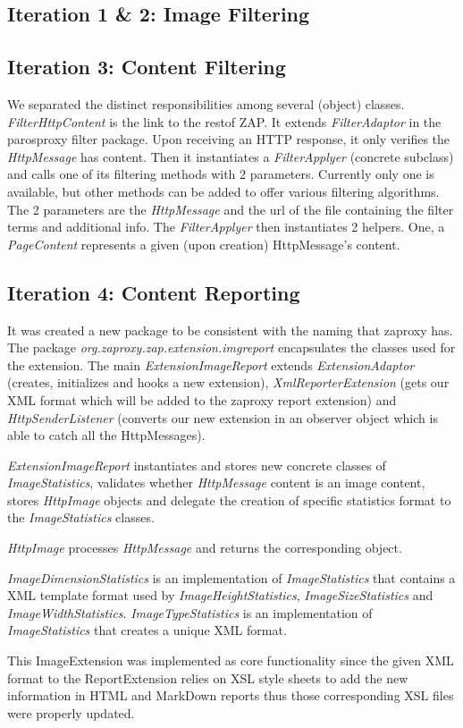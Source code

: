 \subsection{Iteration 1 \& 2: Image Filtering}
\subsection{Iteration 3: Content Filtering}
We separated the distinct responsibilities among several (object) classes. \textit{FilterHttpContent} is the link to the restof ZAP. It extends \textit{FilterAdaptor} in the parosproxy filter package. Upon receiving an HTTP response, it only verifies the \textit{HttpMessage} has content. Then it instantiates a \textit{FilterApplyer} (concrete subclass) and calls one of its filtering methods with 2 parameters. Currently only one is available, but other methods can be added to offer various filtering algorithms. The 2 parameters are the \textit{HttpMessage} and the url of the file containing the filter terms and additional info.
The \textit{FilterApplyer} then instantiates 2 helpers. One, a \textit{PageContent} represents a given (upon creation) HttpMessage's  content.
\subsection{Iteration 4: Content Reporting}
It was created a new package to be consistent with the naming that zaproxy has. The package \textit{org.zaproxy.zap.extension.imgreport} encapsulates the classes used for the extension. The main \textit{ExtensionImageReport} extends \textit{ExtensionAdaptor} (creates, initializes and hooks a new extension), \textit{XmlReporterExtension} (gets our XML format which will be added to the zaproxy report extension) and \textit{HttpSenderListener} (converts our new extension in an observer object which is able to catch all the HttpMessages).
\par
\textit{ExtensionImageReport} instantiates and stores new concrete classes of \textit{ImageStatistics}, validates whether \textit{HttpMessage} content is an image content, stores \textit{HttpImage} objects and delegate the creation of specific statistics format to the \textit{ImageStatistics} classes. 
\par
\textit{HttpImage} processes \textit{HttpMessage} and returns the corresponding object.
\par
\textit{ImageDimensionStatistics} is an implementation of \textit{ImageStatistics} that contains a XML template format used by \textit{ImageHeightStatistics}, \textit{ImageSizeStatistics} and \textit{ImageWidthStatistics}. \textit{ImageTypeStatistics} is an implementation of \textit{ImageStatistics} that creates a unique XML format.
\par
This ImageExtension was implemented as core functionality since the given XML format to the ReportExtension relies on XSL style sheets to add the new information in HTML and MarkDown reports thus those corresponding XSL files were properly updated.

